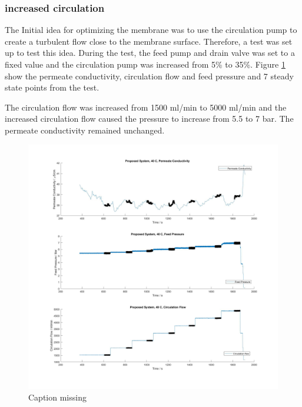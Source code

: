 \newpage
\subsubsection{increased circulation}

The Initial idea for optimizing the membrane was to use the circulation pump to create a turbulent flow close to the membrane surface. Therefore, a test was set up to test this idea.
During the test, the feed pump and drain valve was set to a fixed value and the circulation pump was increased from 5\% to 35\%. Figure \ref{fig:RecIncrease} show the permeate conductivity, circulation flow and feed pressure and 7 steady state points from the test.

The circulation flow was increased from 1500 ml/min to 5000 ml/min and the increased circulation flow caused the pressure to increase from 5.5 to 7 bar. The permeate conductivity remained unchanged. 
\begin{figure}[H]
    \centering
    \includegraphics[width=1.1\textwidth]{RecIncrease40}
    \caption{Caption missing}
    \label{fig:RecIncrease}
\end{figure}  

